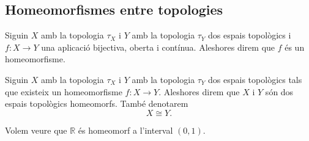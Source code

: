 \documentclass[../Apunts.tex]{subfiles}
\begin{document}
	\subsection{Homeomorfismes entre topologies}
	\begin{definition}[Homeomorfisme]
		\label{def:homeomorfisme entre topologies}
		Siguin \(X\) amb la topologia \(\tau_{X}\) i \(Y\) amb la topologia \(\tau_{Y}\) dos espais topològics i \(f\colon X\longrightarrow Y\) una aplicació bijectiva, oberta i contínua. Aleshores direm que \(f\) és un homeomorfisme.
	\end{definition}
	\begin{definition}
		\label{def:espais topològics homeomorfs}
		Siguin \(X\) amb la topologia \(\tau_{X}\) i \(Y\) amb la topologia \(\tau_{Y}\) dos espais topològics tals que existeix un homeomorfisme \(f\colon X\longrightarrow Y\). Aleshores direm que \(X\) i \(Y\) són dos espais topològics homeomorfs. També denotarem
		\[X\cong Y.\]
	\end{definition}
	\begin{example}
		\label{ex:R és homeomorf a l'interval (0,1)}
		Volem veure que \(\mathbb{R}\) és homeomorf a l'interval \((0,1)\).
		\begin{solution}
		\end{solution}
	\end{example}
\end{document}
